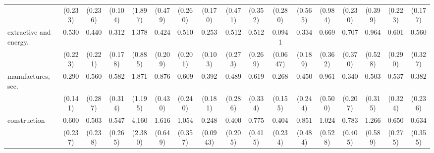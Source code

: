 {\begin{tabular}{l*{16}{c}}
                    &     (0.233)         &     (0.236)         &     (0.104)         &     (1.897)         &     (0.479)         &     (0.260)         &     (0.170)         &     (0.471)         &     (0.352)         &     (0.280)         &     (0.565)         &     (0.984)         &     (0.230)         &     (0.399)         &     (0.223)         &     (0.177)         \\
[1em]
extractive and energy.&       0.530         &       0.440         &       0.312\sym{*}  &       1.378         &       0.424         &       0.510         &       0.253\sym{***}&       0.512         &       0.512         &      0.0941\sym{***}&       0.334         &       0.669         &       0.707         &       0.964         &       0.601         &       0.560         \\
                    &     (0.223)         &     (0.221)         &     (0.178)         &     (0.885)         &     (0.209)         &     (0.201)         &     (0.103)         &     (0.273)         &     (0.269)         &    (0.0647)         &     (0.189)         &     (0.362)         &     (0.370)         &     (0.528)         &     (0.290)         &     (0.327)         \\
[1em]
manufactures, sec.  &       0.290\sym{*}  &       0.560         &       0.582         &       1.871         &       0.876         &       0.609         &       0.392\sym{*}  &       0.489         &       0.619         &       0.268\sym{*}  &       0.450         &       0.961         &       0.340         &       0.503         &       0.537         &       0.382         \\
                    &     (0.141)         &     (0.287)         &     (0.314)         &     (1.195)         &     (0.430)         &     (0.240)         &     (0.181)         &     (0.286)         &     (0.334)         &     (0.155)         &     (0.244)         &     (0.500)         &     (0.207)         &     (0.315)         &     (0.324)         &     (0.236)         \\
[1em]
construction        &       0.600         &       0.503         &       0.547         &       4.160\sym{*}  &       1.616         &       1.054         &       0.248\sym{***}&       0.400         &       0.775         &       0.404         &       0.851         &       1.024         &       0.783         &       1.266         &       0.650         &       0.634         \\
                    &     (0.237)         &     (0.238)         &     (0.265)         &     (2.380)         &     (0.649)         &     (0.357)         &    (0.0943)         &     (0.205)         &     (0.415)         &     (0.234)         &     (0.484)         &     (0.528)         &     (0.405)         &     (0.589)         &     (0.275)         &     (0.355)         \\

\end{tabular}}
